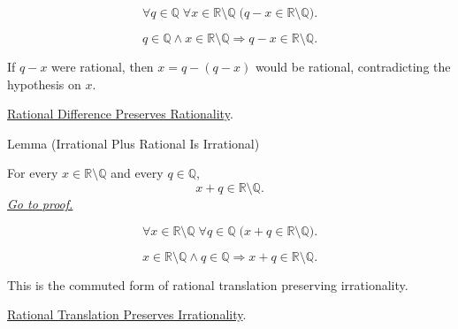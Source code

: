 \begin{remark*}
\[
\forall q\in\mathbb{Q}\;\forall x\in\mathbb{R}\setminus\mathbb{Q}\;
\bigl(q-x\in\mathbb{R}\setminus\mathbb{Q}\bigr).
\]
\end{remark*}

\begin{remark*}
\[
q\in\mathbb{Q}\land x\in\mathbb{R}\setminus\mathbb{Q}
\Longrightarrow q-x\in\mathbb{R}\setminus\mathbb{Q}.
\]
\end{remark*}

\begin{remark*}[Interpretation]
If $q-x$ were rational, then $x=q-(q-x)$ would be rational, contradicting the
hypothesis on $x$.
\end{remark*}

\begin{dependencies}
\hyperref[lem:rational-difference-preserves-rationality]{Rational Difference Preserves Rationality}.
\end{dependencies}

\begin{lemmabox}{Lemma (Irrational Plus Rational Is Irrational)}
\begin{lemma}
\label{lem:irrational-plus-rational-is-irrational}
For every $x\in\mathbb{R}\setminus\mathbb{Q}$ and every $q\in\mathbb{Q}$,
\[
  x+q\in\mathbb{R}\setminus\mathbb{Q}.
\]
\hyperref[prf:irrational-plus-rational-is-irrational]{\textit{Go to proof.}}
\end{lemma}
\end{lemmabox}

\begin{remark*}
\[
\forall x\in\mathbb{R}\setminus\mathbb{Q}\;\forall q\in\mathbb{Q}\;
\bigl(x+q\in\mathbb{R}\setminus\mathbb{Q}\bigr).
\]
\end{remark*}

\begin{remark*}
\[
x\in\mathbb{R}\setminus\mathbb{Q}\land q\in\mathbb{Q}
\Longrightarrow x+q\in\mathbb{R}\setminus\mathbb{Q}.
\]
\end{remark*}

\begin{remark*}[Interpretation]
This is the commuted form of rational translation preserving irrationality.
\end{remark*}

\begin{dependencies}
\hyperref[lem:rational-translation-preserves-irrationality]{Rational Translation Preserves Irrationality}.
\end{dependencies}

